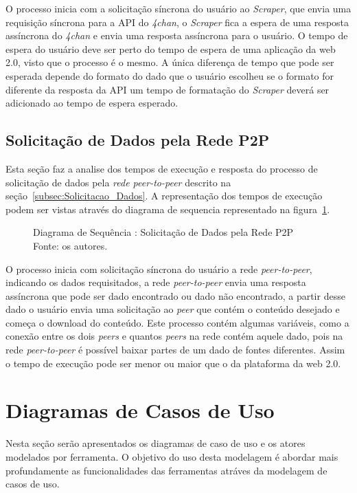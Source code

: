 O processo inicia com a solicitação síncrona do usuário ao \textit{Scraper}, que envia uma requisição síncrona para a API do \textit{4chan}, o \textit{Scraper} fica a espera de uma resposta assíncrona do \textit{4chan} e envia uma resposta assíncrona para o usuário. 
O tempo de espera do usuário deve ser perto do tempo de espera de uma aplicação da web 2.0, visto que o processo é o mesmo. A única diferença de tempo que pode ser esperada depende do formato do dado que o usuário escolheu
se o formato for diferente da resposta da API um tempo de formatação do \textit{Scraper} deverá ser adicionado ao tempo de espera esperado.

\subsection{Solicitação de Dados pela Rede P2P}
Esta seção faz a analise dos tempos de execução e resposta do processo de solicitação de dados pela \textit{rede peer-to-peer} descrito na seção~\ref{subsec:Solicitacao_Dados}. A representação dos tempos de execução podem ser vistas através do diagrama de sequencia representado na figura~\ref{fig:seq_Solicitacao_dados}. 
\begin{figure}[H]
    
    \caption[Diagrama de Sequência :Solicitação de Dados pela Rede P2P]{\label{fig:seq_Solicitacao_dados}
        Diagrama de Sequência : Solicitação de Dados pela Rede P2P\\
        Fonte: os autores.
    }
\end{figure}
O processo inicia com solicitação síncrona do usuário a rede \textit{peer-to-peer}, indicando os dados
requisitados, a rede \textit{peer-to-peer} envia uma resposta assíncrona que pode ser dado encontrado ou dado não encontrado,
a partir desse dado o usuário envia uma solicitação ao \textit{peer} que contém o conteúdo desejado
e começa o download do conteúdo. Este processo contém algumas variáveis, como a conexão entre os dois \textit{peers}
e quantos \textit{peers} na rede contém aquele dado, pois na rede \textit{peer-to-peer} é possível baixar partes de um dado de fontes diferentes. Assim o tempo de execução pode ser menor ou maior que o da plataforma da web 2.0.
\section{Diagramas de Casos de Uso}
Nesta seção serão apresentados os diagramas de caso de uso e os atores
modelados por ferramenta. O objetivo do uso desta modelagem é abordar mais profundamente as funcionalidades das ferramentas atráves da modelagem de casos de uso. 
